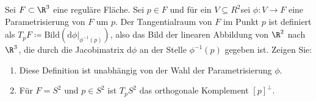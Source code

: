 \newpage
\begin{assignment}
  Sei \( F \subset \R^3 \) eine reguläre Fläche. Sei \( p \in F \) und für ein \( V \subseteq R^2 \)sei \( \phi: V \to F \) eine Parametrisierung von \( F \) um \( p \). Der Tangentialraum von \( F \) im Punkt \( p \) ist definiert als \( T_p F \coloneqq \text{Bild}(\text{d}\phi|_{\phi^{-1}(p)}) \), also das Bild der linearen Abbildung von \( \R^2 \) nach \( \R^3 \), die durch die Jacobimatrix \( \text{d}\phi \) an der Stelle \( \phi^{-1}(p) \) gegeben ist. Zeigen Sie:
  \begin{enumerate}[label=(\alph*)]
    \item Diese Definition ist unabhängig von der Wahl der Parametrisierung \( \phi \).
    \item Für \( F = S^2 \) und \( p \in S^2 \) ist \( T_p S^2 \) das orthogonale Komplement \( {[p]}^\perp \).
  \end{enumerate}
\end{assignment}
